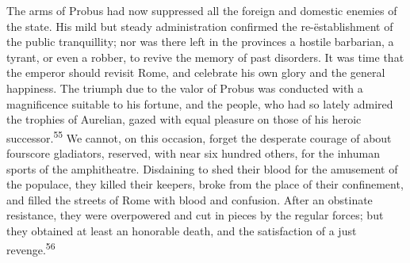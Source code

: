 

The arms of Probus had now suppressed all the foreign and
domestic enemies of the state. His mild but steady administration
confirmed the re-ëstablishment of the public tranquillity; nor
was there left in the provinces a hostile barbarian, a tyrant, or
even a robber, to revive the memory of past disorders. It was
time that the emperor should revisit Rome, and celebrate his own
glory and the general happiness. The triumph due to the valor of
Probus was conducted with a magnificence suitable to his fortune,
and the people, who had so lately admired the trophies of
Aurelian, gazed with equal pleasure on those of his heroic
successor.\textsuperscript{55} We cannot, on this occasion, forget the desperate
courage of about fourscore gladiators, reserved, with near six
hundred others, for the inhuman sports of the amphitheatre.
Disdaining to shed their blood for the amusement of the populace,
they killed their keepers, broke from the place of their
confinement, and filled the streets of Rome with blood and
confusion. After an obstinate resistance, they were overpowered
and cut in pieces by the regular forces; but they obtained at
least an honorable death, and the satisfaction of a just revenge.\textsuperscript{56}



